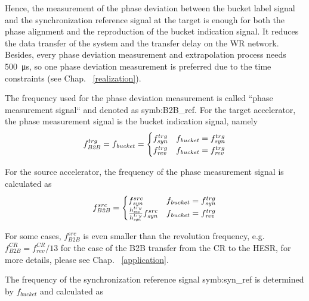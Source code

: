 Hence, the measurement of the phase deviation between the bucket label signal and the synchronization reference signal at the target is enough for both the phase alignment and the reproduction of the bucket indication signal. It reduces the data transfer of the system and the transfer delay on the WR network. Besides, every phase deviation measurement and extrapolation process needs \SI{500}{\us}, so one phase deviation measurement is preferred due to the time constraints (see Chap. ~\ref{realization}). 

The frequency used for the phase deviation measurement is called ``phase measurement signal`` and denoted as \gls{symb:B2B_ref}. For the target accelerator, the phase measurement signal is the bucket indication signal, namely 
\begin{eqnarray}
f_{\mathit{B2B}}^{trg}=f_{\mathit{bucket}}=
\begin{cases}
f_{\mathit{syn}}^{trg} &f_{\mathit{bucket}}=f_{\mathit{syn}}^{trg}\cr

f_{\mathit{rev}}^{trg} &f_{\mathit{bucket}}=f_{\mathit{rev}}^{trg}
\end{cases}
\end{eqnarray} 

For the source accelerator, the frequency of the phase measurement signal is calculated as
\begin{eqnarray}
f_{\mathit{B2B}}^{src}=
\begin{cases}
f_{\mathit{syn}}^{src} &f_{\mathit{bucket}}=f_{\mathit{syn}}^{trg}\cr

\frac{h_{\mathit{rev}}^{trg}}{h_{\mathit{syn}}^{trg}}f_{\mathit{syn}}^{src} &f_{\mathit{bucket}}=f_{\mathit{rev}}^{trg}
\end{cases}
\end{eqnarray}

For some cases, $f_{\mathit{B2B}}^{src}$ is even smaller than the revolution frequency, e.g. $f_{\mathit{B2B}}^{CR}=f_{\mathit{rev}}^{CR}/13$ for the case of the B2B transfer from the CR to the HESR, for more details, please see Chap. ~\ref{application}.

The frequency of the synchronization reference signal \gls{symb:syn_ref} is determined by $f_{\mathit{bucket}}$ and calculated as

